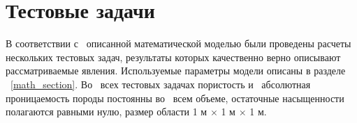 %
\section{Тестовые задачи}
%
В соответствии с~ описанной математической моделью были проведены расчеты
нескольких тестовых задач, результаты которых качественно верно описывают
рассматриваемые явления.
Используемые параметры модели описаны
в разделе ~\ref{math_section}. Во~ всех тестовых задачах
пористость и~ абсолютная проницаемость породы постоянны во~ всем объеме,
остаточные насыщенности полагаются равными нулю, размер области 1 м $\times$ 1 м $\times$ 1 м.